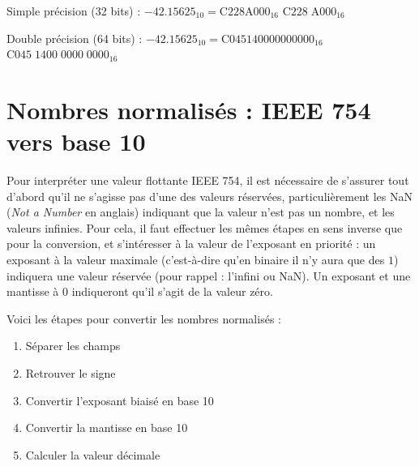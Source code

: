 \documentclass[11pt,a4paper]{article}
\begin{document}
\bigskip


Simple précision (32 bits) : $ -42.15625_{10} = \text{C}228\text{A}000_{16} $  \hfill $ \text{C}228 \; \text{A}000_{16} $  \hfill \phantom{Texte.}

\medskip

Double précision (64 bits) : $ -42.15625_{10} = \text{C}045140000000000_{16} $  \hfill  $ \text{C}045 \; 1400 \; 0000 \; 0000_{16}$  \hfill \phantom{Texte}



\bigskip



\section{Nombres normalisés : IEEE 754 vers base 10}

\bigskip

Pour interpréter une valeur flottante IEEE 754, il est nécessaire de s'assurer tout d'abord qu'il ne s'agisse pas d'une des valeurs réservées, particulièrement les NaN (\textit{Not a Number} en anglais) indiquant que la valeur n'est pas un nombre, et les valeurs infinies.
Pour cela, il faut effectuer les mêmes étapes en sens inverse que pour la conversion, et s'intéresser à la valeur de l'exposant en priorité : un exposant à la valeur maximale (c'est-à-dire qu'en binaire il n'y aura que des $ 1 $) indiquera une valeur réservée (pour rappel : l'infini ou NaN).
Un exposant et une mantisse à $ 0 $ indiqueront qu'il s'agit de la valeur zéro.

\medskip

Voici les étapes pour convertir les nombres normalisés :

\begin{enumerate}
\item Séparer les champs
\item Retrouver le signe
\item Convertir l'exposant biaisé en base 10
\item Convertir la mantisse en base 10
\item Calculer la valeur décimale
\end{enumerate}
\end{document}
